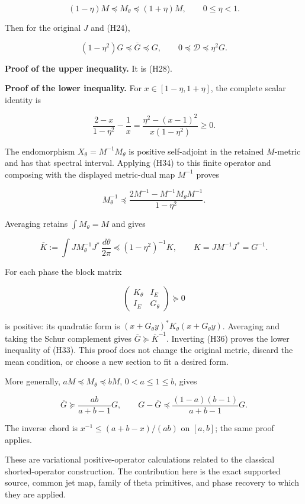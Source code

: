 \[
 (1-\eta)M\preceq M_\theta\preceq(1+\eta)M,
 \qquad 0\leq\eta<1.
 \tag{H32}
\]

Then for the original \(J\) and (H24),

\[
 \boxed{(1-\eta^2)G\preceq\overline G\preceq G,
 \qquad 0\preceq\mathscr D\preceq\eta^2G.}
 \tag{H33}
\]

\textbf{Proof of the upper inequality.} It is (H28).

\textbf{Proof of the lower inequality.} For \(x\in[1-\eta,1+\eta]\), the
complete scalar identity is

\[
 \frac{2-x}{1-\eta^2}-\frac1x
 =\frac{\eta^2-(x-1)^2}{x(1-\eta^2)}\geq0.
 \tag{H34}
\]

The endomorphism \(X_\theta=M^{-1}M_\theta\) is positive self-adjoint in
the retained \(M\)-metric and has that spectral interval. Applying (H34)
to this finite operator and composing with the displayed metric-dual map
\(M^{-1}\) proves

\[
 M_\theta^{-1}\preceq
 \frac{2M^{-1}-M^{-1}M_\theta M^{-1}}{1-\eta^2}.
 \tag{H35}
\]

Averaging retains \(\int M_\theta=M\) and gives

\[
 \overline K:=\int JM_\theta^{-1}J^*\,\frac{d\theta}{2\pi}
 \preceq (1-\eta^2)^{-1}K,\qquad K=JM^{-1}J^*=G^{-1}.
 \tag{H36}
\]

For each phase the block matrix

\[
 \begin{pmatrix}K_\theta&I_E\\I_E&G_\theta\end{pmatrix}\succeq0
 \tag{H37}
\]

is positive: its quadratic form is
\((x+G_\theta y)^*K_\theta(x+G_\theta y)\). Averaging and taking the
Schur complement gives \(\overline G\succeq\overline K^{-1}\). Inverting
(H36) proves the lower inequality of (H33). This proof does not change
the original metric, discard the mean condition, or choose a new section
to fit a desired form.

More generally, \(aM\preceq M_\theta\preceq bM\), \(0<a\leq1\leq b\),
gives

\[
 \overline G\succeq\frac{ab}{a+b-1}G,
 \qquad
 G-\overline G\preceq
 \frac{(1-a)(b-1)}{a+b-1}G.
 \tag{H38}
\]

The inverse chord is \(x^{-1}\leq(a+b-x)/(ab)\) on \([a,b]\); the same
proof applies.

These are variational positive-operator calculations related to the
classical shorted-operator construction. The contribution here is the
exact supported source, common jet map, family of theta primitives, and
phase recovery to which they are applied.

